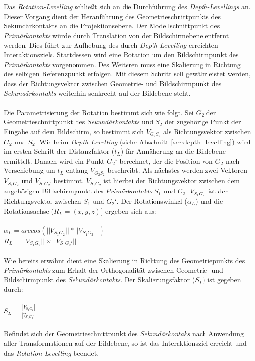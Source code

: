 Das \emph{Rotation-Levelling} schließt sich an die Durchführung des \emph{Depth-Levellings} an. Dieser Vorgang dient der Heranführung des Geometrieschnittpunkts des Sekundärkontakts an die Projektionsebene. Der Modellschnittpunkt des \emph{Primärkontakts} würde durch Translation von der Bildschirmebene entfernt werden. Dies führt zur Aufhebung des durch \emph{Depth-Levelling} erreichten Interaktionsziels. Stattdessen wird eine Rotation um den Bildschirmpunkt des \emph{Primärkontakts} vorgenommen. Des Weiteren muss eine Skalierung in Richtung des selbigen Referenzpunkt erfolgen. Mit diesem Schritt soll gewährleistet werden, dass der Richtungsvektor zwischen Geometrie- und Bildschirmpunkt des \emph{Sekundärkontakts} weiterhin senkrecht auf der Bildebene steht.
\\\\
Die Parametrisierung der Rotation bestimmt sich wie folgt.  Sei $G_2$ der Geometrieschnittpunkt des \emph{Sekundärkontakts} und $S_2$ der zugehörige Punkt der Eingabe auf dem Bildschirm, so bestimmt sich $V_{G_2S_2}$ als Richtungsvektor zwischen $G_2$ und $S_2$. Wie beim \emph{Depth-Levelling} (siehe Abschnitt \ref{sec:depth_levelling}) wird im ersten Schritt der Distanzfaktor ($t_L$) für Annäherung an die Bildebene ermittelt. Danach wird ein Punkt $G_2‘$ berechnet, der die Position von $G_2$ nach Verschiebung um $t_L$ entlang $V_{G_2S_2}$ beschreibt. Als nächstes werden zwei Vektoren $V_{S_1G_2}$ und $V_{S_1G_2‘}$ bestimmt. $V_{S_1G_2}$ ist hierbei der Richtungsvektor zwischen dem zugehörigen Bildschirmpunkt des \emph{Primärkontakts} $S_1$ und $G_2$. $V_{S_1G_2‘}$ ist der Richtungsvektor zwischen $S_1$ und $G_2‘$. Der Rotationswinkel ($\alpha_L$) und die Rotationsachse ($R_L = (x, y, z)$) ergeben sich aus:
\\\\
$\alpha_L = arccos(||V_{S_1G_2}|| * || V_{S_1G_2‘}||)$
\\
$R_L = ||V_{S_1G_2}|| \times ||V_{S_1G_2‘}||$ 
\\\\
Wie bereits erwähnt dient eine Skalierung in Richtung des Geometriepunkts des \emph{Primärkontakts} zum Erhalt der Orthogonalität zwischen Geometrie- und Bildschirmpunkt des \emph{Sekundärkontakts}. Der Skalierungsfaktor ($S_L$) ist gegeben durch:
\\\\
$S_L = \frac{|V_{S_1G_2}|}{|V_{S_1G_2‘}|}$
\\\\
Befindet sich der Geometrieschnittpunkt des \emph{Sekundärkontaks} nach Anwendung aller Transformationen auf der Bildebene, so ist das Interaktionsziel erreicht und das \emph{Rotation-Levelling} beendet.


